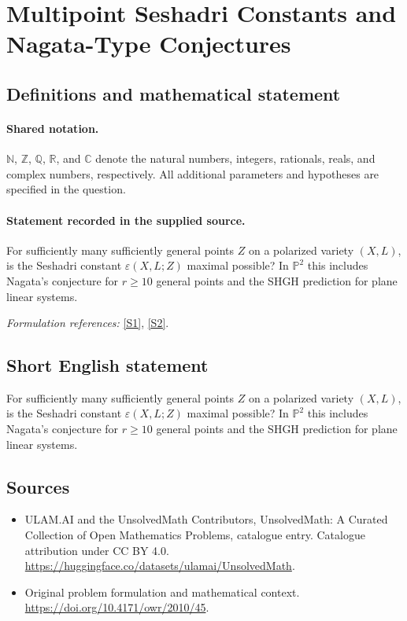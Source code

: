 \documentclass[11pt]{article}
\newcommand{\sref}[2]{\hyperlink{source:#1:#2}{[S#2]}}
\begin{document}
\section{Multipoint Seshadri Constants and Nagata-Type Conjectures}\label{statement}

\subsection{Definitions and mathematical statement}

\paragraph{Shared notation.}$\mathbb N$, $\mathbb Z$, $\mathbb Q$, $\mathbb R$, and $\mathbb C$ denote the natural numbers, integers, rationals, reals, and complex numbers, respectively. All additional parameters and hypotheses are specified in the question.


\paragraph{Statement recorded in the supplied source.}
For sufficiently many sufficiently general points $Z$ on a polarized variety $(X,L)$, is the Seshadri constant $\varepsilon(X,L;Z)$ maximal possible? In $\mathbb{P}^{2}$ this includes Nagata's conjecture for $r\geq10$ general points and the SHGH prediction for plane linear systems.
\par\smallskip\textit{Formulation references:} \sref{statement}{1}, \sref{statement}{2}.
\subsection{Short English statement}
For sufficiently many sufficiently general points $Z$ on a polarized variety $(X,L)$, is the Seshadri constant $\varepsilon(X,L;Z)$ maximal possible? In $\mathbb{P}^{2}$ this includes Nagata's conjecture for $r\geq10$ general points and the SHGH prediction for plane linear systems.
\subsection{Sources}
\begin{itemize}
\item[\hypertarget{source:statement:1}{S1}] ULAM.AI and the UnsolvedMath Contributors, UnsolvedMath: A Curated Collection of Open Mathematics Problems, catalogue entry. Catalogue attribution under CC BY 4.0.
\url{https://huggingface.co/datasets/ulamai/UnsolvedMath}.
\item[\hypertarget{source:statement:2}{S2}] Original problem formulation and mathematical context.
\url{https://doi.org/10.4171/owr/2010/45}.
\end{itemize}
\label{end:statement}
\end{document}

